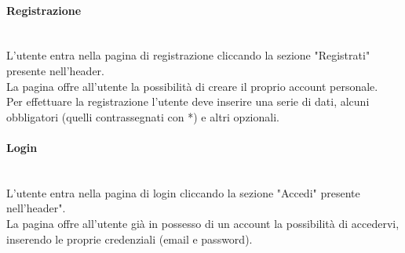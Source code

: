 \paragraph{Registrazione}\mbox{}\\
\label{par:Reg}
L'utente entra nella pagina di registrazione cliccando la sezione "Registrati" presente nell'header.\\
La pagina offre all'utente la possibilità di creare il proprio account personale. \\
Per effettuare la registrazione l'utente deve inserire una serie di dati,
 alcuni obbligatori (quelli contrassegnati con *) e altri opzionali. 

\paragraph{Login}\mbox{}\\
\label{par:Login}
L'utente entra nella pagina di login cliccando la sezione "Accedi" presente nell'header".\\
La pagina offre all'utente già in possesso di un account la possibilità di accedervi, inserendo le proprie credenziali (email e password).


